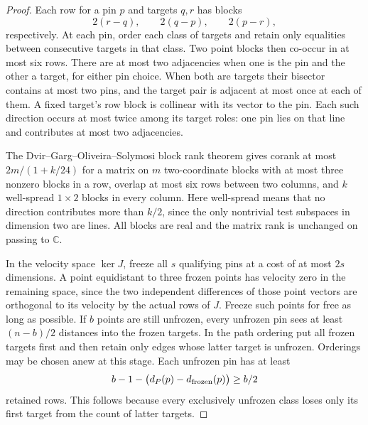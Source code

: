 \begin{proof}
Each row for a pin \(p\) and targets \(q,r\) has blocks
\[
 2(r-q),\qquad 2(q-p),\qquad 2(p-r),
\]
respectively. At each pin, order each class of targets and retain only
equalities between consecutive targets in that class. Two point blocks then
co-occur in at most six rows. There are at most two adjacencies when one is the
pin and the other a target, for either pin choice. When both are targets their
bisector contains at most two pins, and the target pair is adjacent at most
once at each of them. A fixed target's row block is collinear with its vector
to the pin. Each such direction occurs at most twice among its target roles:
one pin lies on that line and contributes at most two adjacencies.

The Dvir--Garg--Oliveira--Solymosi block rank theorem \cite{dgos} gives
corank at most \(2m/(1+k/24)\) for a matrix on \(m\) two-coordinate blocks
with at most three nonzero blocks in a row, overlap at most six rows between
two columns, and \(k\) well-spread \(1\times2\) blocks in every column. Here
well-spread means that no direction contributes more than \(k/2\), since the
only nontrivial test subspaces in dimension two are lines. All blocks are
real and the matrix rank is unchanged on passing to \(\mathbb C\).

In the velocity space \(\ker J\), freeze all \(s\) qualifying pins at a cost
of at most \(2s\) dimensions. A point equidistant to three frozen points has
velocity zero in the remaining space, since the two independent differences
of those point vectors are orthogonal to its velocity by the actual rows of
\(J\). Freeze such points for free as long as possible. If \(b\) points are
still unfrozen, every unfrozen pin sees at least \((n-b)/2\) distances into
the frozen targets. In the path ordering put all frozen targets first and
then retain only edges whose latter target is unfrozen. Orderings may be
chosen anew at this stage. Each unfrozen pin has at least
\[
 b-1-\bigl(d_P(p)-d_{\rm frozen}(p)\bigr)\ge b/2
\]
retained rows. This follows because every exclusively unfrozen class loses
only its first target from the count of latter targets.


\end{proof}
